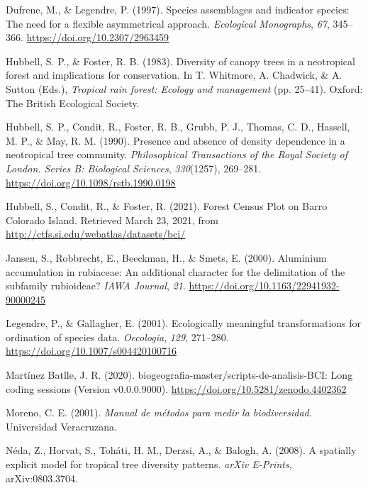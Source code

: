 \documentclass[11pt,]{article}
\begin{document}
\hypertarget{ref-dufrene_legendre}{}
Dufrene, M., \& Legendre, P. (1997). Species assemblages and indicator
species: The need for a flexible asymmetrical approach. \emph{Ecological
Monographs}, \emph{67}, 345--366. \url{https://doi.org/10.2307/2963459}

\hypertarget{ref-hubell_foster_1983}{}
Hubbell, S. P., \& Foster, R. B. (1983). Diversity of canopy trees in a
neotropical forest and implications for conservation. In T. Whitmore, A.
Chadwick, \& A. Sutton (Eds.), \emph{Tropical rain forest: Ecology and
management} (pp. 25--41). Oxford: The British Ecological Society.

\hypertarget{ref-hubell_et_all_1990}{}
Hubbell, S. P., Condit, R., Foster, R. B., Grubb, P. J., Thomas, C. D.,
Hassell, M. P., \& May, R. M. (1990). Presence and absence of density
dependence in a neotropical tree community. \emph{Philosophical
Transactions of the Royal Society of London. Series B: Biological
Sciences}, \emph{330}(1257), 269--281.
\url{https://doi.org/10.1098/rstb.1990.0198}

\hypertarget{ref-web_bci}{}
Hubbell, S., Condit, R., \& Foster, R. (2021). Forest Census Plot on
Barro Colorado Island. Retrieved March 23, 2021, from
\url{http://ctfs.si.edu/webatlas/datasets/bci/}

\hypertarget{ref-article}{}
Jansen, S., Robbrecht, E., Beeckman, H., \& Smets, E. (2000). Aluminium
accumulation in rubiaceae: An additional character for the delimitation
of the subfamily rubioideae? \emph{IAWA Journal}, \emph{21}.
\url{https://doi.org/10.1163/22941932-90000245}

\hypertarget{ref-legendre_galllagher_2001}{}
Legendre, P., \& Gallagher, E. (2001). Ecologically meaningful
transformations for ordination of species data. \emph{Oecologia},
\emph{129}, 271--280. \url{https://doi.org/10.1007/s004420100716}

\hypertarget{ref-jose_ramon_martinez_batlle_2020_4402362}{}
Martínez Batlle, J. R. (2020).
biogeografia-master/scripts-de-analisis-BCI: Long coding sessions
(Version v0.0.0.9000). \url{https://doi.org/10.5281/zenodo.4402362}

\hypertarget{ref-moreno2001manual}{}
Moreno, C. E. (2001). \emph{Manual de métodos para medir la
biodiversidad}. Universidad Veracruzana.

\hypertarget{ref-2008arXiv0803.3704N}{}
Néda, Z., Horvat, S., Toháti, H. M., Derzsi, A., \& Balogh, A. (2008). A
spatially explicit model for tropical tree diversity patterns.
\emph{arXiv E-Prints}, arXiv:0803.3704.
\end{document}
